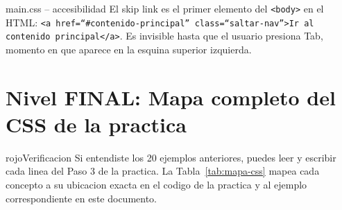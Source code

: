 \documentclass[11pt,a4paper]{article}
\begin{document}
	\begin{cajapractica}{main.css -- accesibilidad}
		El skip link es el primer elemento del \texttt{<body>} en el HTML: \texttt{<a href=``\#contenido-principal'' class=``saltar-nav''>Ir al contenido principal</a>}. Es invisible hasta que el usuario presiona Tab, momento en que aparece en la esquina superior izquierda.
	\end{cajapractica}
	
	\section{Nivel FINAL: Mapa completo del CSS de la practica}
	
	\begin{cajatip}{rojo}{Verificacion}
		Si entendiste los 20 ejemplos anteriores, puedes leer y escribir cada linea del Paso 3 de la practica. La Tabla~\ref{tab:mapa-css} mapea cada concepto a su ubicacion exacta en el codigo de la practica y al ejemplo correspondiente en este documento.
	\end{cajatip}
	
\end{document}
